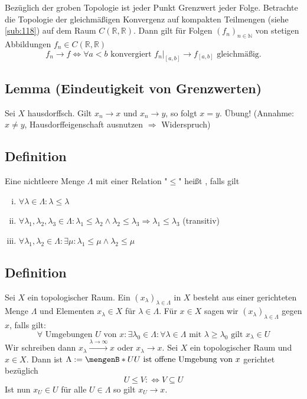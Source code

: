 Bezüglich der groben Topologie ist jeder Punkt Grenzwert jeder Folge.
Betrachte die Topologie der gleichmäßigen Konvergenz auf kompakten Teilmengen (siehe \ref{sub:118}) auf dem Raum $C(\mathds{R},\mathds{R})$. Dann gilt für Folgen 
$(f_n)_{n \in \mathds{N} }$ von stetigen Abbildungen $f_n \in C(\mathds{R},\mathds{R}) $
\[
	f_n \longrightarrow f \iff \forall a < b \text{ konvergiert } f_n|_{[a,b]} \to f_{[a,b]} \text{ gleichmäßig.}
\]

\subsection[Lemma: In Hausdorffräumen sind Grenzwerte eindeutig]{Lemma (Eindeutigkeit von Grenzwerten)} %
\label{sub:32}
Sei $X$ hausdorffsch. Gilt $x_n \to x$ und $x_n \to y$, so folgt $x=y$.
Übung! (Annahme: $x \not= y$, Hausdorffeigenschaft ausnutzen $\Rightarrow $ Widerspruch) \bewende

\subsection[Definition: Gerichtete Menge]{Definition} %
\label{sub:33}
Eine nichtleere Menge $\Lambda $ mit einer Relation "$\le$"{} heißt , falls gilt 
\begin{enumerate}[(i)]
	\item $\forall \lambda  \in \Lambda : \lambda  \le \lambda $
	\item $\forall \lambda_1, \lambda_2, \lambda_3 \in \Lambda  : \lambda_1 \le \lambda_2 \wedge \lambda_2 \le \lambda_3 \Rightarrow \lambda_1 \le \lambda_3$
	\hfill (transitiv)
	\item $\forall \lambda_1, \lambda_2 \in \Lambda : \exists \mu : \lambda_1 \le \mu \wedge \lambda_2 \le \mu$
\end{enumerate} 

\subsection[Definition: Netz und Konvergenz bezüglich eines Netzes]{Definition} %
\label{sub:34}
Sei $X$ ein topologischer Raum. Ein  $(x_\lambda)_{\lambda \in \Lambda }$ in $X$ besteht aus einer gerichteten Menge $\Lambda $ und Elementen 
$x_\lambda \in X$ für $\lambda \in \Lambda $. Für $x \in X$ sagen wir $(x_\lambda )_{\lambda \in \Lambda }$  gegen $x$, falls gilt:
\[
	\forall \text{ Umgebungen } U \text{ von } x : \exists \lambda_0 \in \Lambda : \forall \lambda \in \Lambda \text{ mit } 
	\lambda \ge \lambda_0 \text{ gilt } x_\lambda \in U
\]
Wir schreiben dann $x_\lambda \xrightarrow{\lambda  \to \infty} x$ oder $x_\lambda \longrightarrow x$.
Sei $X$ ein topologischer Raum und $x \in X$.
Dann ist $\Lambda := \set[U]{U \text{ ist offene Umgebung von }x} $ gerichtet bezüglich
\[
	U \le V :\Leftrightarrow V \subseteq U
\]
Ist nun $x_U \in U$ für alle $U \in \Lambda $ so gilt $x_U \longrightarrow x$.


